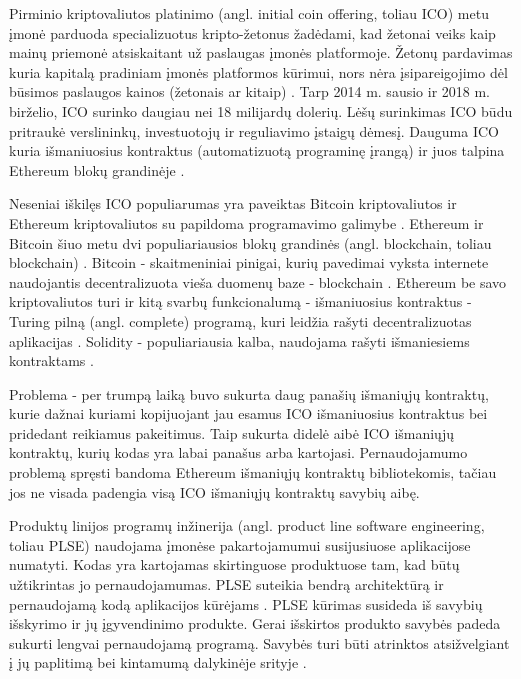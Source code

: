 \documentclass{VUMIFPSbakalaurinis}
\begin{document}
Pirminio kriptovaliutos platinimo (angl. initial coin offering, toliau ICO) metu įmonė parduoda specializuotus kripto-žetonus žadėdami, kad žetonai veiks kaip mainų priemonė atsiskaitant už paslaugas įmonės platformoje. Žetonų pardavimas kuria kapitalą pradiniam įmonės platformos kūrimui, nors nėra įsipareigojimo dėl būsimos paslaugos kainos (žetonais ar kitaip) \cite{Catalini2018}.  Tarp 2014 m. sausio ir 2018 m. birželio, ICO surinko daugiau nei 18 milijardų dolerių. Lėšų surinkimas ICO būdu pritraukė verslininkų, investuotojų ir reguliavimo įstaigų dėmesį. Dauguma ICO kuria išmaniuosius kontraktus (automatizuotą programinę įrangą) ir juos talpina Ethereum blokų grandinėje \cite{Howell2018}.

Neseniai iškilęs ICO populiarumas yra paveiktas Bitcoin kriptovaliutos ir Ethereum kriptovaliutos su papildoma programavimo galimybe \cite{Catalini2018}. Ethereum ir Bitcoin šiuo metu dvi populiariausios blokų grandinės (angl. blockchain, toliau blockchain) \cite{Luu}. Bitcoin - skaitmeniniai pinigai, kurių pavedimai vyksta internete naudojantis decentralizuota vieša duomenų baze - blockchain \cite{Swan2015}. Ethereum be savo kriptovaliutos turi ir kitą svarbų funkcionalumą - išmaniuosius kontraktus - Turing pilną (angl. complete) programą, kuri leidžia rašyti decentralizuotas aplikacijas \cite{Buterin2014}. Solidity - populiariausia kalba, naudojama rašyti išmaniesiems kontraktams \cite{Dannen}.

Problema - per trumpą laiką buvo sukurta daug panašių išmaniųjų kontraktų, kurie dažnai kuriami kopijuojant jau esamus ICO išmaniuosius kontraktus bei pridedant reikiamus pakeitimus. Taip sukurta didelė aibė ICO išmaniųjų kontraktų, kurių kodas yra labai panašus arba kartojasi. Pernaudojamumo problemą spręsti bandoma Ethereum išmaniųjų kontraktų bibliotekomis, tačiau jos ne visada padengia visą ICO išmaniųjų kontraktų savybių aibę.

Produktų linijos programų inžinerija (angl. product line software engineering, toliau PLSE) naudojama įmonėse pakartojamumui susijusiuose aplikacijose numatyti. Kodas yra kartojamas skirtinguose produktuose tam, kad būtų užtikrintas jo pernaudojamumas. PLSE suteikia bendrą architektūrą ir pernaudojamą kodą aplikacijos kūrėjams \cite{Svahnberg}. PLSE kūrimas susideda iš savybių išskyrimo ir jų įgyvendinimo produkte. Gerai išskirtos produkto savybės padeda sukurti lengvai pernaudojamą programą. Savybės turi būti atrinktos atsižvelgiant į jų paplitimą bei kintamumą dalykinėje srityje \cite{Lee2015}.
\end{document}
